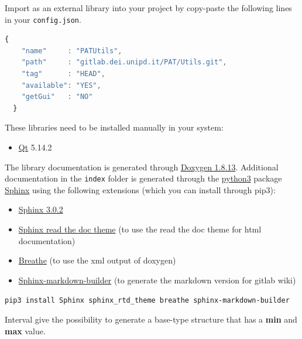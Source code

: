 

Import as an external library into your project by copy-paste the
following lines in your \texttt{config.json}.

\begin{lstlisting}[language=javascript, gobble=2]
  {
    "name"     : "PATUtils",
    "path"     : "gitlab.dei.unipd.it/PAT/Utils.git",
    "tag"      : "HEAD",
    "available": "YES",
    "getGui"   : "NO"
  }
\end{lstlisting}



These libraries need to be installed manually in your system:

\begin{itemize}
  \tightlist
  \item
        \href{https://www.qt.io/}{Qt} 5.14.2
\end{itemize}

The library documentation is generated through
\href{http://www.doxygen.nl/download.html}{Doxygen 1.8.13}. Additional
documentation in the \texttt{index} folder is generated through the
\href{https://www.anaconda.com/products/individual}{python3} package
\href{https://www.sphinx-doc.org/en/master/}{Sphinx} using the following
extensions (which you can install through pip3):

\begin{itemize}
  \tightlist
  \item
        \href{https://pypi.org/project/Sphinx/}{Sphinx 3.0.2}
  \item
        \href{https://sphinx-rtd-theme.readthedocs.io/en/stable/}{Sphinx read
          the doc theme} (to use the read the doc theme for html documentation)
  \item
        \href{https://pypi.org/project/breathe/}{Breathe} (to use the xml
        output of doxygen)
  \item
        \href{https://pypi.org/project/sphinx-markdown-builder/}{Sphinx-markdown-builder}
        (to generate the markdown version for gitlab wiki)
\end{itemize}

\texttt{pip3\ install\ Sphinx\ sphinx\_rtd\_theme\ breathe\ sphinx-markdown-builder}



Interval give the possibility to generate a base-type structure that
has a \textbf{min} and \textbf{max} value.

